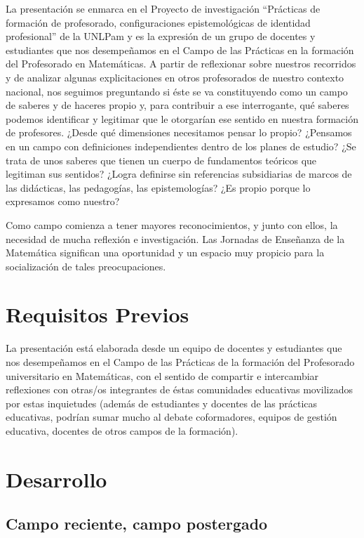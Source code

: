 \documentclass[oneside,spanish]{amsart}
\numberwithin{equation}{section}
\numberwithin{figure}{section}
\theoremstyle{definition}
\begin{document}
La presentación se enmarca en el Proyecto de investigación “Prácticas de formación de profesorado, configuraciones epistemológicas de identidad profesional” de la UNLPam y es la expresión de un grupo de docentes y estudiantes que nos desempeñamos en el Campo de las Prácticas en la formación del Profesorado en Matemáticas. A partir de reflexionar sobre nuestros recorridos y de analizar algunas explicitaciones en otros profesorados de nuestro contexto nacional, nos seguimos preguntando si éste se va constituyendo como un campo de saberes y de haceres propio y, para contribuir a ese interrogante, qué saberes podemos identificar y legitimar que le otorgarían ese sentido en nuestra formación de profesores. ¿Desde qué dimensiones necesitamos pensar lo propio? ¿Pensamos en un campo con definiciones independientes dentro de los planes de estudio?  ¿Se trata de unos saberes que tienen un cuerpo de fundamentos teóricos que legitiman sus sentidos? ¿Logra definirse sin referencias subsidiarias de marcos de las didácticas, las pedagogías, las epistemologías? ¿Es propio porque lo expresamos como nuestro?

Como campo comienza a tener mayores reconocimientos, y junto con ellos, la necesidad de mucha reflexión e investigación. Las Jornadas de Enseñanza de la Matemática significan una oportunidad y un espacio muy propicio para la socialización de tales preocupaciones.


\section{Requisitos Previos}

La presentación está elaborada desde un equipo de docentes y estudiantes que nos desempeñamos en el Campo de las Prácticas de la formación del Profesorado universitario en Matemáticas, con el sentido de compartir e intercambiar reflexiones con otras/os integrantes de éstas comunidades educativas movilizados por estas inquietudes (además de estudiantes y docentes de las prácticas educativas, podrían sumar mucho al debate coformadores, equipos de gestión educativa, docentes de otros campos de la formación).

\section{Desarrollo}

\subsection{Campo reciente, campo postergado}
\end{document}
